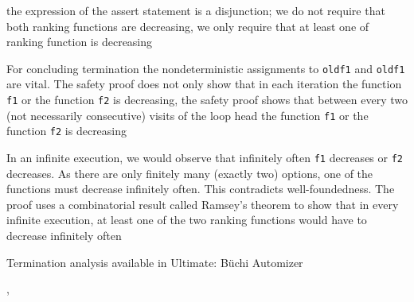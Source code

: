 \documentclass[landscape, a4paper]{article}
\begin{document}
\begin{minipage}[t]{0.2\linewidth}
\begin{betterlist}
		\begin{betterlist}
			\item the expression of the assert statement is a disjunction; we do not require that both ranking functions are decreasing, we only require that at least one of ranking function is decreasing
			\item For concluding termination the nondeterministic assignments to \verb|oldf1| and \verb|oldf1| are vital. The safety proof does not only show that in each iteration the function \verb|f1| or the function \verb|f2| is decreasing, the safety proof shows that between every two (not necessarily consecutive) visits of the loop head the function \verb|f1| or the function \verb|f2| is decreasing
			\item In an infinite execution, we would observe that infinitely often \verb|f1| decreases or \verb|f2| decreases. As there are only finitely many (exactly two) options, one of the functions must decrease infinitely often. This contradicts well-foundedness. The proof uses a combinatorial result called Ramsey’s theorem to show that in every infinite execution, at least one of the two ranking functions would have to decrease infinitely often
			\item Termination analysis available in Ultimate: \alert{Büchi Automizer}
		\end{betterlist}
		\item {}, 
	\end{betterlist}
\end{minipage}
\end{document}
